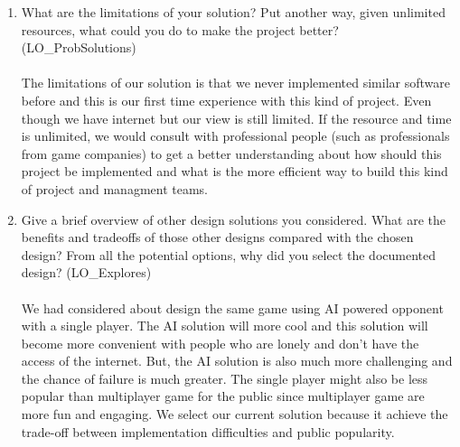 \documentclass[12pt, titlepage]{article}
\begin{document}
\begin{enumerate}
  \item What are the limitations of your solution?  Put another way, given
  unlimited resources, what could you do to make the project better? (LO\_ProbSolutions)\\ \\
  The limitations of our solution is that we never implemented similar software before and this is our first time experience with this kind of project. Even though we have internet but our view is still limited. If the resource and time is unlimited, we would consult with professional people (such as professionals from game companies) to get a better understanding about how should this project be implemented and what is the more efficient way to build this kind of project and managment teams.
  \item Give a brief overview of other design solutions you considered.  What are the benefits and tradeoffs of those other designs compared with the chosen design?  From all the potential options, why did you select the documented design? (LO\_Explores)\\ \\
  We had considered about design the same game using AI powered opponent with a single player. The AI solution will more cool and this solution will become more convenient with people who are lonely and don't have the access of the internet. But, the AI solution is also much more challenging and the chance of failure is much greater. The single player might also be less popular than multiplayer game for the public since multiplayer game are more fun and engaging. We select our current solution because it achieve the trade-off between implementation difficulties and public popularity.
\end{enumerate}
\end{document}
